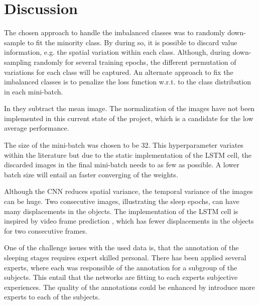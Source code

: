 \section{Discussion}
\label{sec:discussion}

The chosen approach to handle the imbalanced classes was to randomly down-sample to fit the minority class. By during so, it is possible to discard value information, e.g. the spatial variation within each class. Although, during down-sampling randomly for several training epochs, the different permutation of variations for each class will be captured.  
An alternate approach to fix the imbalanced classes is to penalize the loss function w.r.t. to the class distribution in each mini-batch.

In \cite{	main_ar,VGGnet16} they subtract the mean image. The normalization of the images have not been implemented in this current state of the project, which is a candidate for the low average performance.

The size of the mini-batch was chosen to be 32. This hyperparameter variates within the literature but due to the static implementation of the LSTM cell, the discarded images in the final mini-batch needs to as few as possible. A lower batch size will entail an faster converging of the weights. 

Although the CNN reduces spatial variance, the temporal variance of the images can be huge. Two consecutive images, illustrating the sleep epochs, can have many displacements in the objects. The implementation of the LSTM cell is inspired by video frame prediction \cite{git_lstm}, which has fewer displacements in the objects for two consecutive frames. 

One of the challenge issues with the used data is, that the annotation of the sleeping stages requires expert skilled personal. There has been applied several experts, where each was responsible of the annotation for a subgroup of the subjects. This entail that the networks are fitting to each experts subjective experiences. The quality of the annotations could be enhanced by introduce more experts to each of the subjects.

